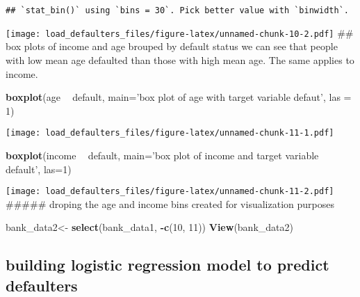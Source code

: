 \documentclass[]{article}
\newenvironment{Shaded}{\begin{snugshade}}{\end{snugshade}}
\newcommand{\DataTypeTok}[1]{\textcolor[rgb]{0.13,0.29,0.53}{#1}}
\newcommand{\DecValTok}[1]{\textcolor[rgb]{0.00,0.00,0.81}{#1}}
\newcommand{\KeywordTok}[1]{\textcolor[rgb]{0.13,0.29,0.53}{\textbf{#1}}}
\newcommand{\NormalTok}[1]{#1}
\newcommand{\OperatorTok}[1]{\textcolor[rgb]{0.81,0.36,0.00}{\textbf{#1}}}
\newcommand{\StringTok}[1]{\textcolor[rgb]{0.31,0.60,0.02}{#1}}
\begin{document}
\begin{verbatim}
## `stat_bin()` using `bins = 30`. Pick better value with `binwidth`.
\end{verbatim}

\texttt{[image: load\_defaulters\_files/figure-latex/unnamed-chunk-10-2.pdf]}
\#\# box plots of income and age brouped by default status we can see
that people with low mean age defaulted than those with high mean age.
The same applies to income.

\begin{Shaded}
\begin{Highlighting}[]
\KeywordTok{boxplot}\NormalTok{(age }\OperatorTok{~}\StringTok{ }\NormalTok{default, }\DataTypeTok{main=}\StringTok{'box plot of age with target variable defaut'}\NormalTok{, }\DataTypeTok{las =} \DecValTok{1}\NormalTok{)}
\end{Highlighting}
\end{Shaded}

\texttt{[image: load\_defaulters\_files/figure-latex/unnamed-chunk-11-1.pdf]}

\begin{Shaded}
\begin{Highlighting}[]
\KeywordTok{boxplot}\NormalTok{(income }\OperatorTok{~}\StringTok{ }\NormalTok{default, }\DataTypeTok{main=}\StringTok{'box plot of income and target variable default'}\NormalTok{, }\DataTypeTok{las=}\DecValTok{1}\NormalTok{)}
\end{Highlighting}
\end{Shaded}

\texttt{[image: load\_defaulters\_files/figure-latex/unnamed-chunk-11-2.pdf]}
\#\#\#\#\# droping the age and income bins created for visualization
purposes

\begin{Shaded}
\begin{Highlighting}[]
\NormalTok{bank_data2<-}\StringTok{ }\KeywordTok{select}\NormalTok{(bank_data1, }\OperatorTok{-}\KeywordTok{c}\NormalTok{(}\DecValTok{10}\NormalTok{, }\DecValTok{11}\NormalTok{))}
\KeywordTok{View}\NormalTok{(bank_data2)}
\end{Highlighting}
\end{Shaded}

\hypertarget{building-logistic-regression-model-to-predict-defaulters}{%
\subsection{building logistic regression model to predict
defaulters}\label{building-logistic-regression-model-to-predict-defaulters}}
\end{document}
